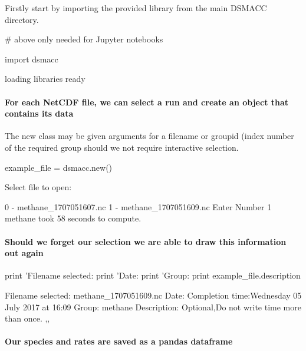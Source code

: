 Firstly start by importing the provided library from the main D\+S\+M\+A\+CC directory.


\begin{DoxyCode}
# above only needed for Jupyter notebooks 

import dsmacc
\end{DoxyCode}
 \begin{DoxyVerb}loading libraries
ready
\end{DoxyVerb}


\paragraph*{For each Net\+C\+DF file, we can select a run and create an object that contains its data}

The {\ttfamily new} class may be given arguments for a filename or groupid (index number of the required group should we not require interactive selection.


\begin{DoxyCode}
example\_file = dsmacc.new()
\end{DoxyCode}
 \begin{DoxyVerb}Select file to open: 

0  -  methane_1707051607.nc
1  -  methane_1707051609.nc
Enter Number 
1
methane took 58 seconds to compute.
\end{DoxyVerb}


\paragraph*{Should we forget our selection we are able to draw this information out again}


\begin{DoxyCode}
print 'Filename selected: %
print 'Date: %
print 'Group: %
print example\_file.description
\end{DoxyCode}
 \begin{DoxyVerb}Filename selected: methane_1707051609.nc
Date: Completion time:Wednesday 05 July 2017 at 16:09
Group: methane
Description: Optional,Do not write time more than once. ,,
\end{DoxyVerb}


\paragraph*{Our species and rates are saved as a pandas dataframe}


